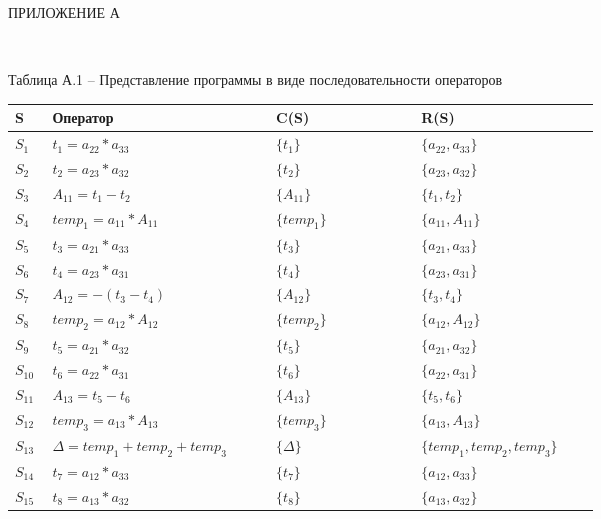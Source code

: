 \documentclass[a4paper,14pt]{article}
\begin{document}
    \begin{center} ПРИЛОЖЕНИЕ А \end{center}\\ \vspace{5mm}

Таблица А.1 – Представление программы в виде последовательности операторов\\
            \setlength{\tabcolsep}{15pt}
            \renewcommand{\arraystretch}{1.5}

            \begin{tabular}{|p{0.03\linewidth}|p{0.25\linewidth}|p{0.2\linewidth}|p{0.2\linewidth}|}
                \hline
                S & Оператор & C(S) & R(S) \\ \hline
                $S_{1}$ &$t_{1} = a_{22}*a_{33}$ &$\{t_{1}\}$ &$\{a_{22}, a_{33}\}$ \\ \hline
$S_{2}$ &$t_{2} = a_{23}*a_{32}$ &$\{t_{2}\}$ &$\{a_{23}, a_{32}\}$ \\ \hline
$S_{3}$ &$A_{11} = t_{1} - t_{2}$ &$\{A_{11}\}$ &$\{t_{1}, t_{2}\}$ \\ \hline
$S_{4}$ &$temp_{1} = a_{11}*A_{11}$ &$\{temp_{1}\}$ &$\{a_{11}, A_{11}\}$ \\ \hline
$S_{5}$ &$t_{3} = a_{21}*a_{33}$ &$\{t_{3}\}$ &$\{a_{21}, a_{33}\}$ \\ \hline
$S_{6}$ &$t_{4} = a_{23}*a_{31}$ &$\{t_{4}\}$ &$\{a_{23}, a_{31}\}$ \\ \hline
$S_{7}$ &$A_{12} = -(t_{3} - t_{4})$ &$\{A_{12}\}$ &$\{t_{3}, t_{4}\}$ \\ \hline
$S_{8}$ &$temp_{2} = a_{12}*A_{12}$ &$\{temp_{2}\}$ &$\{a_{12}, A_{12}\}$ \\ \hline
$S_{9}$ &$t_{5} = a_{21}*a_{32}$ &$\{t_{5}\}$ &$\{a_{21}, a_{32}\}$ \\ \hline
$S_{10}$ &$t_{6} = a_{22}*a_{31}$ &$\{t_{6}\}$ &$\{a_{22}, a_{31}\}$ \\ \hline
$S_{11}$ &$A_{13} = t_{5} - t_{6}$ &$\{A_{13}\}$ &$\{t_{5}, t_{6}\}$ \\ \hline
$S_{12}$ &$temp_{3} = a_{13}*A_{13}$ &$\{temp_{3}\}$ &$\{a_{13}, A_{13}\}$ \\ \hline
$S_{13}$ &$\Delta = temp_{1} + temp_{2} + temp_{3}$ &$\{\Delta\}$ &$\{temp_{1}, temp_{2}, temp_{3}\}$ \\ \hline
$S_{14}$ &$t_{7} = a_{12}*a_{33}$ &$\{t_{7}\}$ &$\{a_{12}, a_{33}\}$ \\ \hline
$S_{15}$ &$t_{8} = a_{13}*a_{32}$ &$\{t_{8}\}$ &$\{a_{13}, a_{32}\}$ \\ \hline

\end{tabular}
\end{document}
